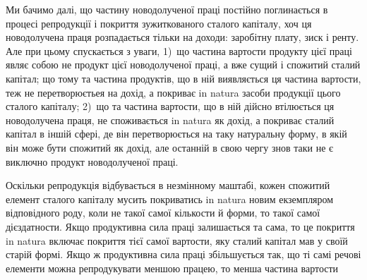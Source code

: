Ми бачимо далі, що частину новодолученої праці постійно поглинається
в процесі репродукції і покриття зужиткованого сталого капіталу, хоч ця новодолучена
праця розпадається тільки на доходи: заробітну плату, зиск і ренту.
Але при цьому спускається з уваги, 1)~що частина вартости продукту цієї
праці являє собою не продукт цієї новодолученої праці, а вже сущий і спожитий
сталий капітал; що тому та частина продуктів, що в ній виявляється
ця частина вартости, теж не перетворюєтьея на дохід, а покриває in natura
засоби продукції цього сталого капіталу; 2)~що та частина вартости, що в ній
дійсно втілюється ця новодолучена праця, не споживається in natura як дохід,
а покриває сталий капітал в іншій сфері, де він перетворюється на таку натуральну
форму, в якій він може бути спожитий як дохід, але останній в свою
чергу знов таки не є виключно продукт новодолученої праці.

Оскільки репродукція відбувається в незмінному маштабі, кожен спожитий
елемент сталого капіталу мусить покриватись in natura новим екземпляром відповідного роду, коли не
такої самої кількости й форми, то такої самої дієздатности.
Якщо продуктивна сила праці залишається та сама, то це покриття in
natura включає покриття тієї самої вартости, яку сталий капітал мав у своїй
старій формі. Якщо ж продуктивна сила праці збільшується так, що ті самі
речові елементи можна репродукувати меншою працею, то менша частина вартости
\parbreak{}  %
